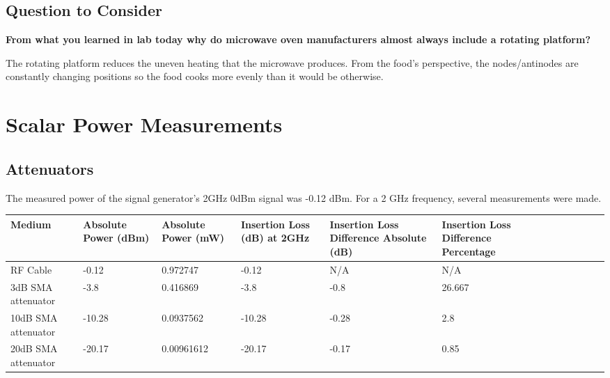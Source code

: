 \documentclass[conference]{IEEEtran}
\begin{document}
\subsection{Question to Consider}

\textbf{From what you learned in lab today why do microwave oven manufacturers
almost always include a rotating platform?}

The rotating platform reduces the uneven heating that the microwave produces.
From the food’s perspective, the nodes/antinodes are constantly changing
positions so the food cooks more evenly than it would be otherwise.    

\section{Scalar Power Measurements}

\subsection{Attenuators}
The measured power of the signal generator's 2GHz 0dBm signal was -0.12 dBm. For
a 2 GHz frequency, several measurements were made.
\begin{table}[htbp]
\begin{tabular}{|l p{3em}|l p{3em}|l p{3em}|l p{3em}|l p{3em}|l p{3em}|}
\hline
\textbf{Medium}     & \textbf{Absolute Power (dBm)} & \textbf{Absolute Power (mW)} & \textbf{Insertion Loss (dB) at 2GHz} & \textbf{Insertion Loss Difference Absolute (dB)} & \textbf{Insertion Loss Difference Percentage} \\ \hline
RF Cable            & -0.12                         & 0.972747                     & -0.12                                & N/A                                              & N/A                                           \\ \hline
3dB SMA attenuator  & -3.8                          & 0.416869                     & -3.8                                 & -0.8                                             & 26.667                                        \\ \hline
10dB SMA attenuator & -10.28                        & 0.0937562                    & -10.28                               & -0.28                                            & 2.8                                           \\ \hline
20dB SMA attenuator & -20.17                        & 0.00961612                   & -20.17                               & -0.17                                            & 0.85                                          \\ \hline
\end{tabular}
\end{table}
\end{document}
